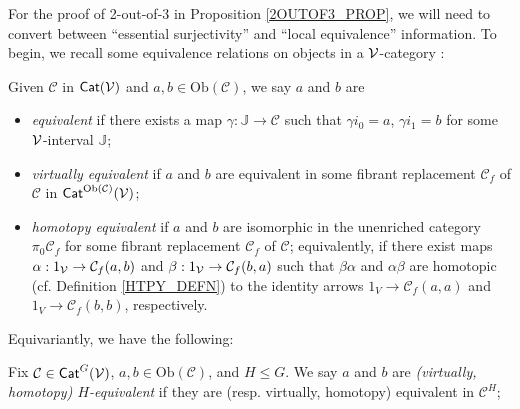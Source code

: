\documentclass[a4paper,10pt
]{article}%
\newcommand{\J}{\mathbb J}
\renewcommand{\1}{\ensuremath{\mathbb{id}}}
\begin{document}
For the proof of 2-out-of-3 in Proposition \ref{2OUTOF3_PROP}, we will need to convert between
``essential surjectivity'' and ``local equivalence'' information. 
To begin, we recall some equivalence relations on objects in a $\mathcal V$-category \cite{Cav14, BM13}:
\begin{definition}
      Given $\mathcal{C}$ in  $\mathsf{Cat}(\mathcal V)$ and $a,b\in\mathrm{Ob}(\mathcal C)$, we say $a$ and $b$ are
      \begin{itemize}
      \item {\em equivalent} if there exists a map $\gamma: \J \to \mathcal C$ such that
            $\gamma i_0 = a$, $\gamma i_1 = b$
            for some $\mathcal V$-interval $\J$;
      \item {\em virtually equivalent} if $a$ and $b$ are equivalent in some fibrant replacement
            $\mathcal C_f$ of $\mathcal C$ in $\mathsf{Cat}^{\mathrm{Ob}(\mathcal C)}(\mathcal V)$;
      \item {\em homotopy equivalent} if $a$ and $b$ are isomorphic in the unenriched category $\pi_0 \mathcal C_f$
            for some fibrant replacement $\mathcal C_f$ of $\mathcal C$;
            equivalently, if there exist maps
            $\alpha: 1_{\mathcal V} \to \mathcal C_f(a,b)$ and $\beta: 1_{\mathcal V}\to \mathcal C_f(b,a)$ such that
            $\beta\alpha$ and $\alpha\beta$ are homotopic (cf. Definition \ref{HTPY_DEFN})
            to the identity arrows
            $1_V\to \mathcal C_f(a,a)$ and $1_V \to \mathcal C_f(b,b)$, respectively.
      \end{itemize}
\end{definition}

Equivariantly, we have the following:
\begin{definition}
      Fix $\mathcal{C}\in \mathsf{Cat}^G(\mathcal V)$, $a,b\in \mathrm{Ob}(\mathcal{C})$, and $H \leq G$.
      We say $a$ and $b$ are 
      \textit{(virtually, homotopy) $H$-equivalent}
      if they are (resp. virtually, homotopy) equivalent in $\mathcal{C}^H$;
\end{definition}
\end{document}
